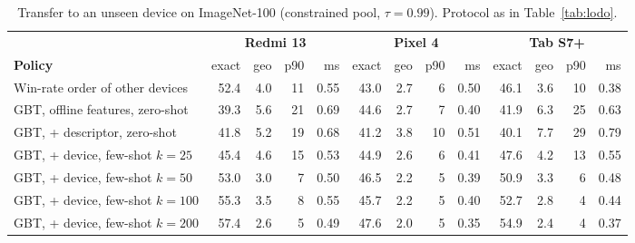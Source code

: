 \begin{table}[!htbp]
\centering
\caption{Transfer to an unseen device on ImageNet-100 (constrained pool,
$\tau=0.99$). Protocol as in Table~\ref{tab:lodo}.}
\label{tab:lodo_im100}
\footnotesize
\setlength{\tabcolsep}{3.5pt}
\begin{tabular}{@{}l rrrr rrrr rrrr@{}}
\toprule
& \multicolumn{4}{c}{\textbf{Redmi 13}} & \multicolumn{4}{c}{\textbf{Pixel 4}} & \multicolumn{4}{c}{\textbf{Tab S7+}}\\
\cmidrule(lr){2-5}\cmidrule(lr){6-9}\cmidrule(lr){10-13}
\textbf{Policy} & exact & geo & p90 & ms & exact & geo & p90 & ms & exact & geo & p90 & ms\\
\midrule
Win-rate order of other devices & 52.4 & 4.0 & 11 & 0.55 & 43.0 & 2.7 & 6 & 0.50 & 46.1 & 3.6 & 10 & 0.38 \\
GBT, offline features, zero-shot & 39.3 & 5.6 & 21 & 0.69 & 44.6 & 2.7 & 7 & 0.40 & 41.9 & 6.3 & 25 & 0.63 \\
GBT, + descriptor, zero-shot & 41.8 & 5.2 & 19 & 0.68 & 41.2 & 3.8 & 10 & 0.51 & 40.1 & 7.7 & 29 & 0.79 \\
\midrule
GBT, + device, few-shot $k=25$ & 45.4 & 4.6 & 15 & 0.53 & 44.9 & 2.6 & 6 & 0.41 & 47.6 & 4.2 & 13 & 0.55 \\
GBT, + device, few-shot $k=50$ & 53.0 & 3.0 & 7 & 0.50 & 46.5 & 2.2 & 5 & 0.39 & 50.9 & 3.3 & 6 & 0.48 \\
GBT, + device, few-shot $k=100$ & 55.3 & 3.5 & 8 & 0.55 & 45.7 & 2.2 & 5 & 0.40 & 52.7 & 2.8 & 4 & 0.44 \\
GBT, + device, few-shot $k=200$ & 57.4 & 2.6 & 5 & 0.49 & 47.6 & 2.0 & 5 & 0.35 & 54.9 & 2.4 & 4 & 0.37 \\
\bottomrule
\end{tabular}
\end{table}

